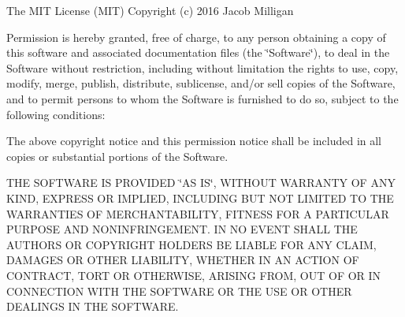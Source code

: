 The M\+IT License (M\+IT) Copyright (c) 2016 Jacob Milligan

Permission is hereby granted, free of charge, to any person obtaining a copy of this software and associated documentation files (the \char`\"{}\+Software\char`\"{}), to deal in the Software without restriction, including without limitation the rights to use, copy, modify, merge, publish, distribute, sublicense, and/or sell copies of the Software, and to permit persons to whom the Software is furnished to do so, subject to the following conditions\+:

The above copyright notice and this permission notice shall be included in all copies or substantial portions of the Software.

T\+HE S\+O\+F\+T\+W\+A\+RE IS P\+R\+O\+V\+I\+D\+ED \char`\"{}\+A\+S I\+S\char`\"{}, W\+I\+T\+H\+O\+UT W\+A\+R\+R\+A\+N\+TY OF A\+NY K\+I\+ND, E\+X\+P\+R\+E\+SS OR I\+M\+P\+L\+I\+ED, I\+N\+C\+L\+U\+D\+I\+NG B\+UT N\+OT L\+I\+M\+I\+T\+ED TO T\+HE W\+A\+R\+R\+A\+N\+T\+I\+ES OF M\+E\+R\+C\+H\+A\+N\+T\+A\+B\+I\+L\+I\+TY, F\+I\+T\+N\+E\+SS F\+OR A P\+A\+R\+T\+I\+C\+U\+L\+AR P\+U\+R\+P\+O\+SE A\+ND N\+O\+N\+I\+N\+F\+R\+I\+N\+G\+E\+M\+E\+NT. IN NO E\+V\+E\+NT S\+H\+A\+LL T\+HE A\+U\+T\+H\+O\+RS OR C\+O\+P\+Y\+R\+I\+G\+HT H\+O\+L\+D\+E\+RS BE L\+I\+A\+B\+LE F\+OR A\+NY C\+L\+A\+IM, D\+A\+M\+A\+G\+ES OR O\+T\+H\+ER L\+I\+A\+B\+I\+L\+I\+TY, W\+H\+E\+T\+H\+ER IN AN A\+C\+T\+I\+ON OF C\+O\+N\+T\+R\+A\+CT, T\+O\+RT OR O\+T\+H\+E\+R\+W\+I\+SE, A\+R\+I\+S\+I\+NG F\+R\+OM, O\+UT OF OR IN C\+O\+N\+N\+E\+C\+T\+I\+ON W\+I\+TH T\+HE S\+O\+F\+T\+W\+A\+RE OR T\+HE U\+SE OR O\+T\+H\+ER D\+E\+A\+L\+I\+N\+GS IN T\+HE S\+O\+F\+T\+W\+A\+RE. 